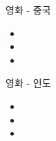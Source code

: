 \documentclass[aspectratio=1610,20pt,xcolor=pdftex,dvipsnames,table,handout]{beamer}
\begin{document}
		\begin{frame} [t,plain]
			\begin{block} {영화 - 중국}
			\setlength{\leftmargini}{2em}			
			\begin{itemize}
				\item 
				\item 
				\item 
			\end{itemize}
			\end{block}						
		\end{frame}						

		\begin{frame} [t,plain]
			\begin{block} {영화 - 인도}
			\setlength{\leftmargini}{2em}			
			\begin{itemize}
				\item 
				\item 
				\item 
			\end{itemize}
			\end{block}						
		\end{frame}						
\end{document}
